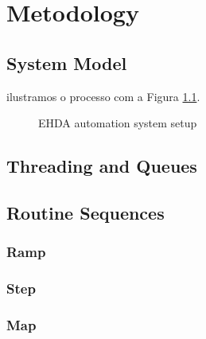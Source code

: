 \chapter{Metodology}
\label{chap:Metodology}


\section{System Model}
\label{sec:control_model}

ilustramos o processo com a Figura \ref{fig:control_model_fig}. 

\begin{figure}[thpb]
  \centering
  \caption{EHDA automation system setup}
  \label{fig:control_model_fig}
\end{figure}

\section{Threading and Queues}
\label{sec:concurrency}

\section{Routine Sequences}
\label{sec:routine_sequences}

\subsection{Ramp}

\subsection{Step}



\subsection{Map}

